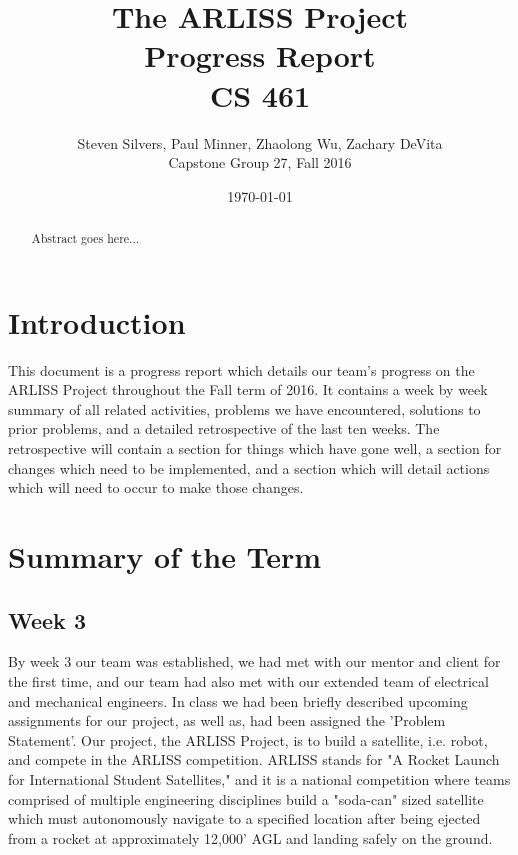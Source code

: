 \documentclass[10pt,letterpaper,onecolumn,draftclsnofoot,journal]{IEEEtran}
\begin{document}
\begin{titlepage}
	\title{The ARLISS Project\\Progress Report\\CS 461}
	\author{Steven Silvers, Paul Minner, Zhaolong Wu, Zachary DeVita\\
		Capstone Group 27, Fall 2016}
	\date{\today}
	\maketitle
	\vspace{4cm}
	\begin{abstract}
		\noindent Abstract goes here...
	\end{abstract}

\end{titlepage}
\tableofcontents
\clearpage

\section{Introduction}
This document is a progress report which details our team's progress on the ARLISS Project throughout the Fall term of 2016. It  contains a week by week summary of all related activities, problems we have encountered, solutions to prior problems, and a detailed retrospective of the last ten weeks. The retrospective will contain a section for things which have gone well, a section for changes which need to be implemented, and a section which will detail actions which will need to occur to make those changes.  

\section{Summary of the Term}
\subsection{Week 3}
By week 3 our team was established, we had met with our mentor and client for the first time, and our team had also met with our extended team of electrical and mechanical engineers. In class we had been briefly described upcoming assignments for our project, as well as, had been assigned the 'Problem Statement'. Our project, the ARLISS Project, is to build a satellite, i.e. robot, and compete in the ARLISS competition. ARLISS stands for "A Rocket Launch for International Student Satellites," and it is a national competition where teams comprised of multiple engineering disciplines build a "soda-can" sized satellite which must autonomously navigate to a specified location after being ejected from a rocket at approximately 12,000' AGL and landing safely on the ground.
 
\end{document}
